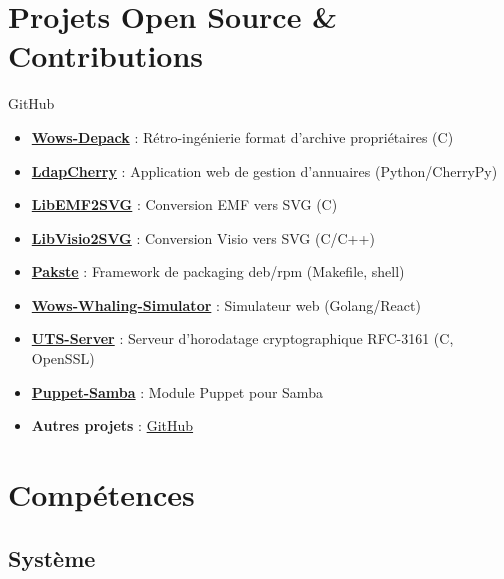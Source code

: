 \documentclass[10pt,a4paper,sans]{moderncv}
\begin{document}
\section{Projets Open Source \& Contributions}
        {GitHub}
        {}
        {}
        {
            \begin{itemize}
            \item \textbf{\href{https://github.com/wows-tools/wows-depack}{Wows-Depack}} : Rétro-ingénierie format d'archive propriétaires (C)
            \item \textbf{\href{https://github.com/kakwa/ldapcherry}{LdapCherry}} : Application web de gestion d'annuaires (Python/CherryPy)
            \item \textbf{\href{https://github.com/kakwa/libemf2svg}{LibEMF2SVG}} : Conversion EMF vers SVG (C)
            \item \textbf{\href{https://github.com/kakwa/libvisio2svg}{LibVisio2SVG}} : Conversion Visio vers SVG (C/C++)
            \item \textbf{\href{https://github.com/kakwa/pakste}{Pakste}} : Framework de packaging deb/rpm (Makefile, shell)
            \item \textbf{\href{https://github.com/wows-tools/wows-whaling-simulator}{Wows-Whaling-Simulator}} : Simulateur web (Golang/React)
            \item \textbf{\href{https://github.com/kakwa/uts-server}{UTS-Server}} : Serveur d'horodatage cryptographique RFC-3161 (C, OpenSSL)
            \item \textbf{\href{https://github.com/kakwa/puppet-samba}{Puppet-Samba}} : Module Puppet pour Samba
            \item \textbf{Autres projets} : \href{https://github.com/kakwa?tab=repositories&q=&type=&language=&sort=stargazers}{GitHub}
            \end{itemize}
        }

\section{Compétences}

\subsection{Système}
\end{document}
